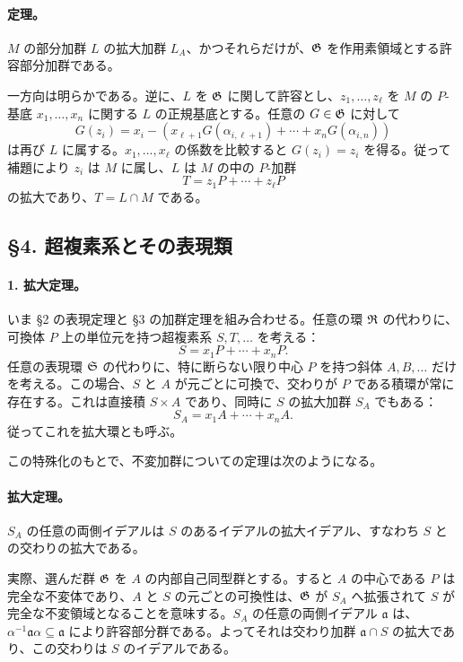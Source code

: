 \paragraph{定理。}
\(M\) の部分加群 \(L\) の拡大加群 \(L_A\)、かつそれらだけが、\(\mathfrak G\) を作用素領域とする許容部分加群である。

一方向は明らかである。逆に、\(L\) を \(\mathfrak G\) に関して許容とし、\(z_1,\ldots,z_\ell\) を \(M\) の \(P\)-基底 \(x_1,\ldots,x_n\) に関する \(L\) の正規基底とする。任意の \(G\in\mathfrak G\) に対して
\[
        G(z_i)=x_i-(x_{\ell+1}G(\alpha_{i,\ell+1})+\cdots+x_nG(\alpha_{i,n}))
\]
は再び \(L\) に属する。\(x_1,\ldots,x_\ell\) の係数を比較すると \(G(z_i)=z_i\) を得る。従って補題により \(z_i\) は \(M\) に属し、\(L\) は \(M\) の中の \(P\)-加群
\[
        T=z_1P+\cdots+z_\ell P
\]
の拡大であり、\(T=L\cap M\) である。

\subsection*{§4. 超複素系とその表現類}

\paragraph{1. 拡大定理。}
いま §2 の表現定理と §3 の加群定理を組み合わせる。任意の環 \(\mathfrak R\) の代わりに、可換体 \(P\) 上の単位元を持つ超複素系 \(S,T,\ldots\) を考える：
\[
        S=x_1P+\cdots+x_nP.
\]
任意の表現環 \(\mathfrak S\) の代わりに、特に断らない限り中心 \(P\) を持つ斜体 \(A,B,\ldots\) だけを考える。この場合、\(S\) と \(A\) が元ごとに可換で、交わりが \(P\) である積環が常に存在する。これは直接積 \(S\times A\) であり、同時に \(S\) の拡大加群 \(S_A\) でもある：
\[
        S_A=x_1A+\cdots+x_nA.
\]
従ってこれを拡大環とも呼ぶ。

この特殊化のもとで、不変加群についての定理は次のようになる。

\paragraph{拡大定理。}
\(S_A\) の任意の両側イデアルは \(S\) のあるイデアルの拡大イデアル、すなわち \(S\) との交わりの拡大である。

実際、選んだ群 \(\mathfrak G\) を \(A\) の内部自己同型群とする。すると \(A\) の中心である \(P\) は完全な不変体であり、\(A\) と \(S\) の元ごとの可換性は、\(\mathfrak G\) が \(S_A\) へ拡張されて \(S\) が完全な不変領域となることを意味する。\(S_A\) の任意の両側イデアル \(\mathfrak a\) は、\(\alpha^{-1}\mathfrak a\alpha\subseteq \mathfrak a\) により許容部分群である。よってそれは交わり加群 \(\mathfrak a\cap S\) の拡大であり、この交わりは \(S\) のイデアルである。

